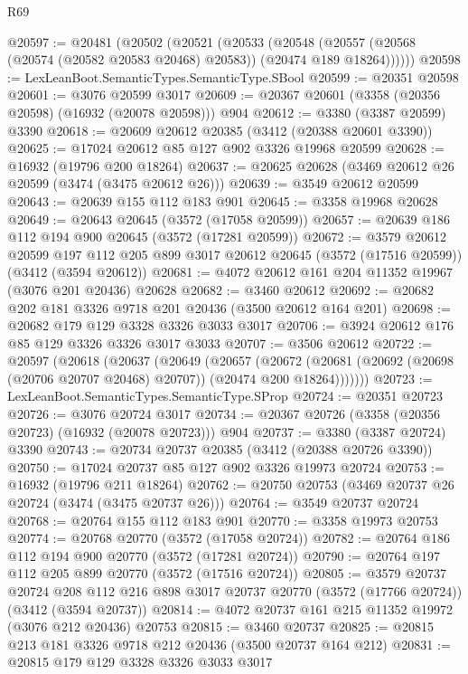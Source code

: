 \begin{lexlean}{R69}
\begin{coremodule}
@20597 := @20481
    (@20502
      (@20521
        (@20533
          (@20548 (@20557 (@20568 (@20574 (@20582 @20583 @20468) @20583)) (@20474 @189 @18264))))))
@20598 := LexLeanBoot.SemanticTypes.SemanticType.SBool
@20599 := @20351 @20598
@20601 := @3076 @20599 @3017
@20609 := @20367 @20601 (@3358 (@20356 @20598) (@16932 (@20078 @20598))) @904
@20612 := @3380 (@3387 @20599) @3390
@20618 := @20609 @20612 @20385 (@3412 (@20388 @20601 @3390))
@20625 := @17024 @20612 @85 @127 @902 @3326 @19968 @20599
@20628 := @16932 (@19796 @200 @18264)
@20637 := @20625 @20628 (@3469 @20612 @26 @20599 (@3474 (@3475 @20612 @26)))
@20639 := @3549 @20612 @20599
@20643 := @20639 @155 @112 @183 @901
@20645 := @3358 @19968 @20628
@20649 := @20643 @20645 (@3572 (@17058 @20599))
@20657 := @20639 @186 @112 @194 @900 @20645 (@3572 (@17281 @20599))
@20672 := @3579
    @20612
    @20599
    @197
    @112
    @205
    @899
    @3017
    @20612
    @20645
    (@3572 (@17516 @20599))
    (@3412 (@3594 @20612))
@20681 := @4072 @20612 @161 @204 @11352 @19967 (@3076 @201 @20436) @20628
@20682 := @3460 @20612
@20692 := @20682 @202 @181 @3326 @9718 @201 @20436 (@3500 @20612 @164 @201)
@20698 := @20682 @179 @129 @3328 @3326 @3033 @3017
@20706 := @3924 @20612 @176 @85 @129 @3326 @3326 @3017 @3033
@20707 := @3506 @20612
@20722 := @20597
    (@20618
      (@20637
        (@20649
          (@20657
            (@20672
              (@20681 (@20692 (@20698 (@20706 @20707 @20468) @20707)) (@20474 @200 @18264)))))))
@20723 := LexLeanBoot.SemanticTypes.SemanticType.SProp
@20724 := @20351 @20723
@20726 := @3076 @20724 @3017
@20734 := @20367 @20726 (@3358 (@20356 @20723) (@16932 (@20078 @20723))) @904
@20737 := @3380 (@3387 @20724) @3390
@20743 := @20734 @20737 @20385 (@3412 (@20388 @20726 @3390))
@20750 := @17024 @20737 @85 @127 @902 @3326 @19973 @20724
@20753 := @16932 (@19796 @211 @18264)
@20762 := @20750 @20753 (@3469 @20737 @26 @20724 (@3474 (@3475 @20737 @26)))
@20764 := @3549 @20737 @20724
@20768 := @20764 @155 @112 @183 @901
@20770 := @3358 @19973 @20753
@20774 := @20768 @20770 (@3572 (@17058 @20724))
@20782 := @20764 @186 @112 @194 @900 @20770 (@3572 (@17281 @20724))
@20790 := @20764 @197 @112 @205 @899 @20770 (@3572 (@17516 @20724))
@20805 := @3579
    @20737
    @20724
    @208
    @112
    @216
    @898
    @3017
    @20737
    @20770
    (@3572 (@17766 @20724))
    (@3412 (@3594 @20737))
@20814 := @4072 @20737 @161 @215 @11352 @19972 (@3076 @212 @20436) @20753
@20815 := @3460 @20737
@20825 := @20815 @213 @181 @3326 @9718 @212 @20436 (@3500 @20737 @164 @212)
@20831 := @20815 @179 @129 @3328 @3326 @3033 @3017

\end{coremodule}
\end{lexlean}
